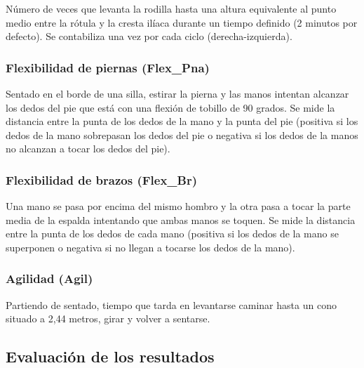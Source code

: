 Número de veces que levanta la rodilla hasta una altura equivalente al punto medio entre la rótula y la cresta ilíaca durante un tiempo definido (2 minutos por defecto). Se contabiliza una vez por cada ciclo (derecha-izquierda).


\subsubsection{Flexibilidad de piernas (Flex\_Pna)}

Sentado en el borde de una silla, estirar la pierna y las manos intentan alcanzar los dedos del pie que está con una flexión de tobillo de 90 grados. Se mide la distancia entre la punta de los dedos de la mano y la punta del pie (positiva si los dedos de la mano sobrepasan los dedos del pie o negativa si los dedos de la manos no alcanzan a tocar los dedos del pie).


\subsubsection{Flexibilidad de brazos (Flex\_Br)}

Una mano se pasa por encima del mismo hombro y la otra pasa a tocar la parte media de la espalda intentando que ambas manos se toquen. Se mide la distancia entre la punta de los dedos de cada mano (positiva si los dedos de la mano se superponen o negativa si no llegan a tocarse los dedos de la mano).


\subsubsection{Agilidad (Agil)}

Partiendo de sentado, tiempo que tarda en levantarse caminar hasta un cono situado a 2,44 metros, girar y volver a sentarse.


\subsection{Evaluación de los resultados}

